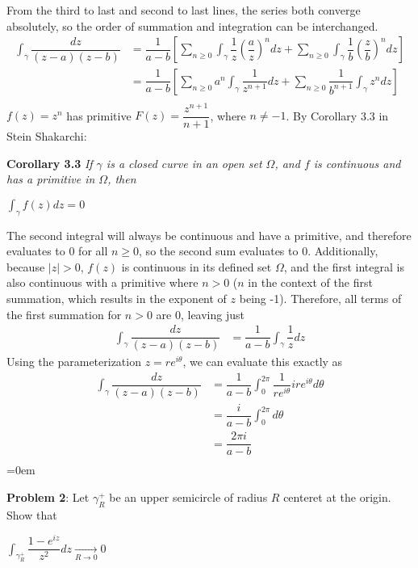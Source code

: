 \documentclass{article}
\begin{document}
From the third to last and second to last lines, the series both converge absolutely, so the order of summation and integration can be interchanged.
\begin{align*}
    \int_{\gamma} \dfrac{dz}{(z-a)(z-b)}&= \dfrac{1}{a-b}\left[ \sum\limits_{n\geq 0}\int_\gamma\dfrac{1}{z}(\dfrac{a}{z})^ndz   + \sum\limits_{n\geq 0} \int_\gamma \dfrac{1}{b}(\dfrac{z}{b})^ndz\right]\\
    &= \dfrac{1}{a-b}\left[ \sum\limits_{n\geq 0}a^n\int_\gamma\dfrac{1}{z^{n+1}}dz   + \sum\limits_{n\geq 0} \dfrac{1}{b^{n+1}}\int_\gamma z^ndz\right]\\
\end{align*}
$f(z) = z^n$ has primitive $F(z) = \dfrac{z^{n+1}}{n+1}$, where $n \neq -1$. By Corollary 3.3 in Stein Shakarchi:

\textbf{Corollary 3.3} \emph{If $\gamma$ is a closed curve in an open set $\Omega$, and $f$ is continuous and has a primitive in $\Omega$, then}
\begin{center}
    $\int_\gamma f(z) dz = 0$
\end{center}
The second integral will always be continuous and have a primitive, and therefore evaluates to 0 for all $n \geq 0$, so the second sum evaluates to 0. Additionally, because $|z| > 0$, $f(z)$ is continuous in its defined set $\Omega$, and the first integral is also continuous with a primitive where $n > 0$ ($n$ in the context of the first summation, which results in the exponent of $z$ being -1). Therefore, all terms of the first summation for $n > 0$ are 0, leaving just 
\begin{align*}
    \int_{\gamma} \dfrac{dz}{(z-a)(z-b)} &= \dfrac{1}{a-b}\int_\gamma\dfrac{1}{z}dz
\end{align*}
Using the parameterization $z = re^{i\theta}$, we can evaluate this exactly as 
\begin{align*}
    \int_{\gamma} \dfrac{dz}{(z-a)(z-b)} &= \dfrac{1}{a-b}\int_{0}^{2\pi}\dfrac{1}{re^{i\theta}}ire^{i\theta}d\theta\\
&= \dfrac{i}{a-b}\int_0^{2\pi} d\theta\\
&= \dfrac{2\pi i}{a-b}\\
\end{align*}
\newpage\parskip=0em
\begin{mdframed}[backgroundcolor=blue!20]
\textbf{Problem 2}: Let $\gamma_R^+$ be an upper semicircle of radius $R$ centeret at the origin. Show that 
\begin{center}
    $\int_{\gamma_R^+}\dfrac{1-e^{iz}}{z^2}dz \underset{R\rightarrow 0}{\rightarrow} 0  $
\end{center}
\end{mdframed}
\end{document}
